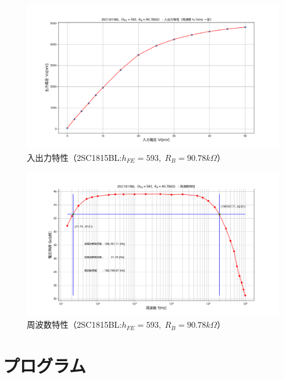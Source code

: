 \documentclass[uplatex,a4paper,11pt,oneside,openany]{jsbook}
\begin{document}
\newpage

  \begin{figure}[H]
    \centering
     \includegraphics[keepaspectratio, scale=0.48, angle=0]
                 {figs/png/iocharM1B.png}
                 \caption{入出力特性（2SC1815BL:$h_{FE}=593,\;R_B=90.78k\Omega$）}
                 \label{fig:iocharM1B}
 \end{figure}

 \begin{figure}[H]
    \centering
     \includegraphics[keepaspectratio, scale=0.48, angle=0]
               {figs/png/freqcharM1B.png}
               \caption{周波数特性（2SC1815BL:$h_{FE}=593,\;R_B=90.78k\Omega$）}
               \label{fig:freqcharM1B}
 \end{figure}

\newpage

\section{プログラム}
\end{document}
